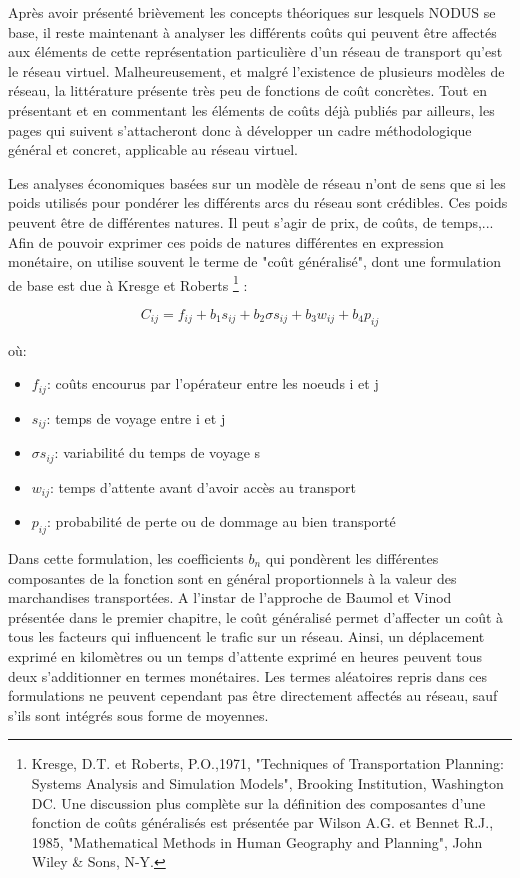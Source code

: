 Après avoir présenté brièvement les concepts théoriques sur lesquels NODUS se
base, il reste maintenant à analyser les différents coûts qui peuvent être
affectés aux éléments de cette représentation particulière d'un réseau de
transport qu'est le réseau virtuel. Malheureusement, et malgré l'existence de
plusieurs modèles de réseau, la littérature présente très peu de fonctions de
coût concrètes. Tout en présentant et en commentant les éléments de coûts déjà
publiés par ailleurs, les pages qui suivent s'attacheront donc à développer un
cadre méthodologique général et concret, applicable au réseau virtuel.

Les analyses économiques basées sur un modèle de réseau n'ont de sens que si les
poids utilisés pour pondérer les différents arcs du réseau sont crédibles. Ces
poids peuvent être de différentes natures. Il peut s'agir de prix, de coûts, de
temps,... Afin de pouvoir exprimer ces poids de natures différentes en
expression monétaire, on utilise souvent le terme de "coût généralisé", dont une
formulation de base est due à Kresge et Roberts \footnote{Kresge, D.T. et
Roberts, P.O.,1971, "Techniques of Transportation Planning: Systems Analysis and
Simulation Models", Brooking Institution, Washington DC. Une discussion plus
complète sur la définition des composantes d'une fonction de coûts généralisés
est présentée par Wilson A.G. et Bennet R.J., 1985, "Mathematical Methods in
Human Geography and Planning", John Wiley \& Sons, N-Y. } :

$$C_{ij}=f_{ij}+b_1s_{ij}+b_2\sigma s_{ij}+b_3w_{ij}+b_4p_{ij}$$

où:
\begin{itemize}
\item $f_{ij}$: coûts encourus par l'opérateur entre les noeuds i et j
\item $s_{ij}$: temps de voyage entre i et j
\item $\sigma s_{ij}$: variabilité du temps de voyage s
\item $w_{ij}$: temps d'attente avant d'avoir accès au transport
\item $p_{ij}$: probabilité de perte ou de dommage au bien transporté
\end{itemize}


Dans cette formulation, les coefficients $b_n$ qui pondèrent les différentes
compo\-san\-tes de la fonction sont en général proportionnels à la valeur des
marchandises transportées. A l'instar de l'approche de Baumol et Vinod présentée
dans le premier chapitre, le coût généralisé permet d'affecter un coût à tous
les facteurs qui influencent le trafic sur un réseau. Ainsi, un déplacement
exprimé en kilomè\-tres ou un temps d'attente exprimé en heures peuvent tous
deux s'additionner en termes monétaires. Les termes aléatoires repris dans ces
formulations ne peuvent cependant pas être directement affectés au réseau, sauf
s'ils sont intégrés sous forme de moyennes.


